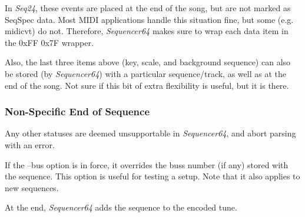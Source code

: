    In \textsl{Seq24}, these events are placed at the end of the song, but are
   not marked as SeqSpec data.  Most MIDI applications handle this situation
   fine, but some (e.g. midicvt) do not.  Therefore, \textsl{Sequencer64} makes
   sure to wrap each data item in the 0xFF 0x7F wrapper.

   Also, the last three items above (key, scale, and background sequence) can
   also be stored (by \textsl{Sequencer64}) with a particular sequence/track,
   as well as at the end of the song.  Not sure if this bit of extra
   flexibility is useful, but it is there.

\subsubsection{Non-Specific End of Sequence}
\label{subsubsec:midi_format_meta_sequence_ends}

   Any other statuses are deemed unsupportable in \textsl{Sequencer64}, and
   abort parsing with an error.

   If the --bus option is in force, it overrides the buss number (if any)
   stored with the sequence.  This option is useful for testing a setup.
   Note that it also applies to new sequences.

   At the end, \textsl{Sequencer64} adds the sequence to the encoded tune.

